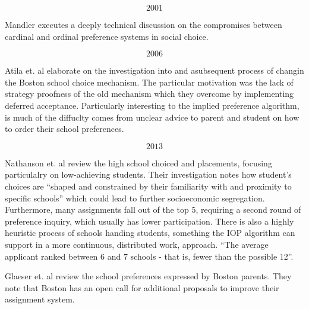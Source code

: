 \[2001\]

Mandler executes a deeply technical discussion on the compromises between cardinal and ordinal preference systems in social choice. \cite{2001_Mandler}

\[2006\]

Atila et. al elaborate on the investigation into and asubsequent process of changin the Boston school choice mechanism. \cite{2006_Atlia} The particular motivation was the lack of strategy proofness of the old mechanism which they overcome by implementing deferred acceptance. Particularly interesting to the implied preference algorithm, is much of the diffuclty comes from unclear advice to parent and student on how to order their school preferences.

\[2013\]

Nathanson et. al review the high school choiced and placements, focusing particulalry on low-achieving students. \cite{2013_Nathanson} Their investigation notes how student's choices are ``shaped and constrained by their familiarity with and proximity to specific schools'' which could lead to further socioeconomic segregation. Furthermore, many assignments fall out of the top 5, requiring a second round of preference inquiry, which usually has lower participation. There is also a highly heuristic process of schools handing students, something the IOP algorithm can support in a more continuous, distributed work, approach. ``The average applicant ranked between 6 and 7 schools - that is, fewer than the possible 12''. 

Glaeser et. al review the school preferences expressed by Boston parents. \cite{2013_Glaeser} They note that Boston has an open call for additional proposals to improve their assignment system. 